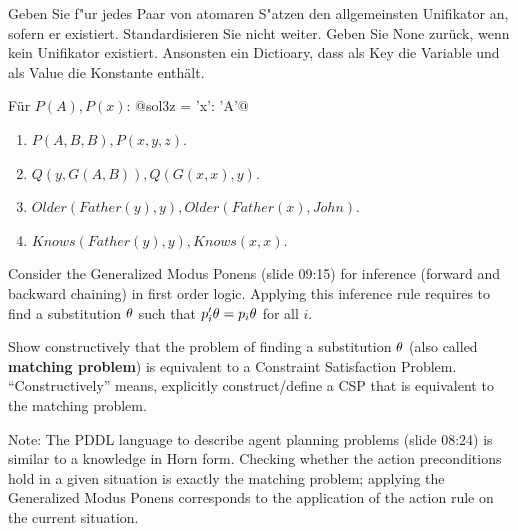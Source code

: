 
Geben Sie f"ur jedes Paar von atomaren S"atzen den allgemeinsten
Unifikator an, sofern er existiert. Standardisieren Sie nicht
weiter. Geben Sie None zurück, wenn kein Unifikator
existiert. Ansonsten ein Dictioary, dass als Key die Variable und als
Value die Konstante enthält.

Für $P(A), P(x)$: \qquad @sol3z = {'x': 'A'}@

\begin{enumerate}
\item $P(A,B,B), P(x,y,z)$.
\item $Q(y,G(A,B)), Q(G(x,x),y)$.
\item $Older(Father(y),y), Older(Father(x), John)$.
\item $Knows(Father(y),y), Knows(x, x)$.
\end{enumerate}




Consider the Generalized Modus Ponens (slide 09:15) for inference
(forward and backward chaining) in first order logic. Applying this
inference rule requires to find a substitution $\theta$ such that
$p_i'\theta = p_i\theta$ for all $i$.

Show constructively that the problem of finding a substitution $\theta$
(also called \textbf{matching problem}) is equivalent to a Constraint
Satisfaction Problem. ``Constructively'' means, explicitly
construct/define a CSP that is equivalent to the matching problem.

Note: The PDDL language to describe agent planning problems (slide
08:24) is similar to a knowledge in Horn form. Checking whether the
action preconditions hold in a given situation is exactly the matching
problem; applying the Generalized Modus Ponens corresponds to the
application of the action rule on the current situation.






